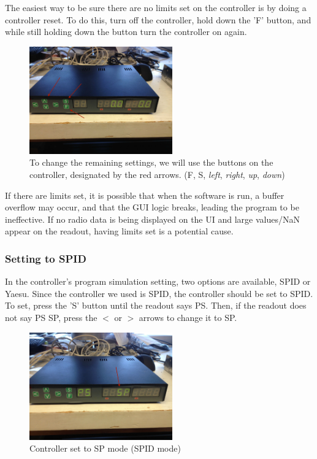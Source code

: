 \documentclass[11pt]{article} %
\begin{document}
The easiest way to be sure there are no limits set on the controller is by doing a controller reset. To do this, turn off the controller, hold down the 'F' button, and while still holding down the button turn the controller on again.  
\begin{figure}[H]
  \centering
  \includegraphics[width=0.55\textwidth]{controller/01.jpeg}
 \caption{To change the remaining settings, we will use the buttons on the controller, designated by the red arrows. (F, S, \emph{left}, \emph{right}, \emph{up}, \emph{down})}
\end{figure}

If there are limits set, it is possible that when the software is run, a buffer overflow may occur, and that the GUI logic breaks, leading the program to be ineffective. If no radio data is being displayed on the UI and large values/NaN appear on the readout, having limits set is a potential cause.

\subsubsection{Setting to SPID}

In the controller's program simulation setting, two options are available, SPID or Yaesu. Since the controller we used is SPID, the controller should be set to SPID. To set, press the 'S' button until the readout says PS. Then, if the readout does not say PS SP, press the $<$ or $>$ arrows to change it to SP. 

\begin{figure}[H]
  \centering
  \includegraphics[width=0.55\textwidth]{controller/02.jpeg}
  \caption{Controller set to SP mode (SPID mode) }
\end{figure}
\end{document}
